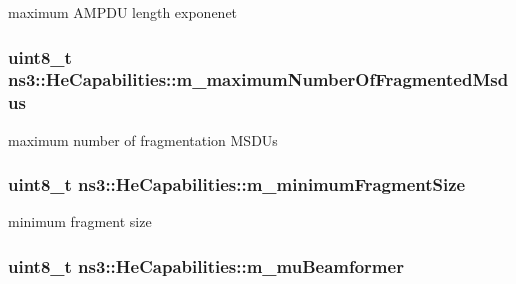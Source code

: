 maximum A\+M\+P\+DU length exponenet 

\subsubsection[{\texorpdfstring{m\+\_\+maximum\+Number\+Of\+Fragmented\+Msdus}{m_maximumNumberOfFragmentedMsdus}}]{\setlength{\rightskip}{0pt plus 5cm}uint8\+\_\+t ns3\+::\+He\+Capabilities\+::m\+\_\+maximum\+Number\+Of\+Fragmented\+Msdus\hspace{0.3cm}{\ttfamily [private]}}\hypertarget{classns3_1_1HeCapabilities_a05c27329d2e963ea800201b5180ed4c5}{}\label{classns3_1_1HeCapabilities_a05c27329d2e963ea800201b5180ed4c5}


maximum number of fragmentation M\+S\+D\+Us 

\subsubsection[{\texorpdfstring{m\+\_\+minimum\+Fragment\+Size}{m_minimumFragmentSize}}]{\setlength{\rightskip}{0pt plus 5cm}uint8\+\_\+t ns3\+::\+He\+Capabilities\+::m\+\_\+minimum\+Fragment\+Size\hspace{0.3cm}{\ttfamily [private]}}\hypertarget{classns3_1_1HeCapabilities_a8a64ff2ed1cd3136fd8026c3562c9d9c}{}\label{classns3_1_1HeCapabilities_a8a64ff2ed1cd3136fd8026c3562c9d9c}


minimum fragment size 

\subsubsection[{\texorpdfstring{m\+\_\+mu\+Beamformer}{m_muBeamformer}}]{\setlength{\rightskip}{0pt plus 5cm}uint8\+\_\+t ns3\+::\+He\+Capabilities\+::m\+\_\+mu\+Beamformer\hspace{0.3cm}{\ttfamily [private]}}\hypertarget{classns3_1_1HeCapabilities_ab372f215235e3d509eeaf07301687a08}{}\label{classns3_1_1HeCapabilities_ab372f215235e3d509eeaf07301687a08}


